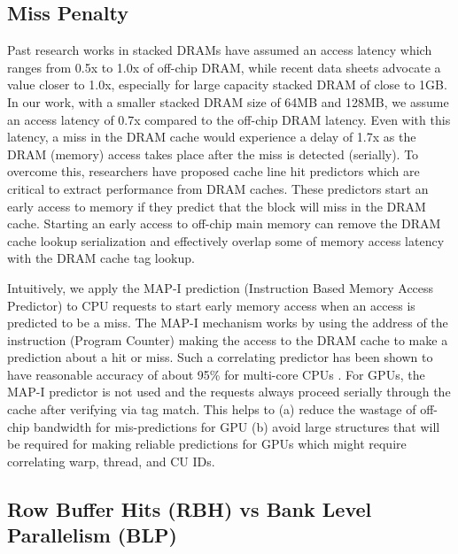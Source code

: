 \subsection{Miss Penalty}
Past research works in stacked DRAMs have assumed an access latency which ranges from 0.5x to 1.0x of off-chip DRAM, while recent data sheets advocate a value closer to 1.0x, especially for large capacity stacked DRAM of close to 1GB. In our work, with a smaller stacked DRAM size of 64MB and 128MB, we assume an access latency of 0.7x compared to the off-chip DRAM latency. Even with this latency, a miss in the DRAM cache would experience a delay of 1.7x as the DRAM (memory) access takes place after the miss is detected (serially). To overcome this, researchers have proposed cache line hit predictors \cite{loh-hill,alloy} which are critical to extract performance from DRAM caches. These predictors start an early access to memory if they predict that the block will miss in the DRAM cache. Starting an early access to off-chip main memory can remove the DRAM cache lookup serialization and effectively overlap some of memory access latency with the DRAM cache tag lookup.
\par Intuitively, we apply the MAP-I prediction (Instruction Based Memory Access Predictor) \cite{alloy} to CPU requests to start early memory access when an access is predicted to be a miss. The MAP-I mechanism works by using the address of the instruction (Program Counter) making the access to the DRAM cache to make a prediction about a hit or miss. Such a correlating predictor has been shown to have reasonable accuracy of about 95\% for multi-core CPUs \cite{alloy}. For GPUs, the MAP-I predictor is not used and the requests always proceed serially through the cache after verifying via tag match. This helps to (a) reduce the wastage of off-chip bandwidth for mis-predictions for GPU (b) avoid large structures that will be required for making reliable predictions for GPUs which might require correlating warp, thread, and CU IDs.

\subsection{Row Buffer Hits (RBH) vs Bank Level Parallelism (BLP)} 

